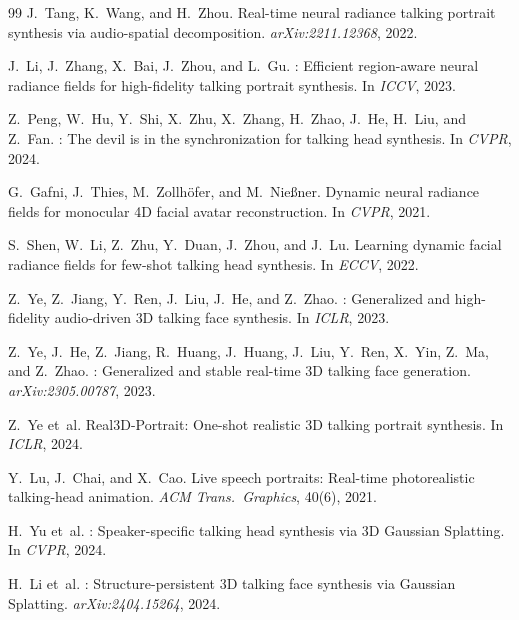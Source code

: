 \documentclass[10pt,twocolumn,letterpaper]{article}
\begin{document}
{\begin{thebibliography}{99}
J.~Tang, K.~Wang, and H.~Zhou.
\newblock Real-time neural radiance talking portrait synthesis via audio-spatial decomposition.
\newblock \emph{arXiv:2211.12368}, 2022.

J.~Li, J.~Zhang, X.~Bai, J.~Zhou, and L.~Gu.
: Efficient region-aware neural radiance fields for high-fidelity talking portrait synthesis.
\newblock In \emph{ICCV}, 2023.

Z.~Peng, W.~Hu, Y.~Shi, X.~Zhu, X.~Zhang, H.~Zhao, J.~He, H.~Liu, and Z.~Fan.
: The devil is in the synchronization for talking head synthesis.
\newblock In \emph{CVPR}, 2024.

G.~Gafni, J.~Thies, M.~Zollh{\"o}fer, and M.~Nie{\ss}ner.
\newblock Dynamic neural radiance fields for monocular {4D} facial avatar reconstruction.
\newblock In \emph{CVPR}, 2021.

S.~Shen, W.~Li, Z.~Zhu, Y.~Duan, J.~Zhou, and J.~Lu.
\newblock Learning dynamic facial radiance fields for few-shot talking head synthesis.
\newblock In \emph{ECCV}, 2022.

Z.~Ye, Z.~Jiang, Y.~Ren, J.~Liu, J.~He, and Z.~Zhao.
: Generalized and high-fidelity audio-driven {3D} talking face synthesis.
\newblock In \emph{ICLR}, 2023.

Z.~Ye, J.~He, Z.~Jiang, R.~Huang, J.~Huang, J.~Liu, Y.~Ren, X.~Yin, Z.~Ma, and Z.~Zhao.
: Generalized and stable real-time {3D} talking face generation.
\newblock \emph{arXiv:2305.00787}, 2023.

Z.~Ye et~al.
\newblock Real3D-Portrait: One-shot realistic {3D} talking portrait synthesis.
\newblock In \emph{ICLR}, 2024.

Y.~Lu, J.~Chai, and X.~Cao.
\newblock Live speech portraits: Real-time photorealistic talking-head animation.
\newblock \emph{ACM Trans.\ Graphics}, 40(6), 2021.

H.~Yu et~al.
: Speaker-specific talking head synthesis via {3D Gaussian Splatting}.
\newblock In \emph{CVPR}, 2024.

H.~Li et~al.
: Structure-persistent {3D} talking face synthesis via {Gaussian Splatting}.
\newblock \emph{arXiv:2404.15264}, 2024.


\end{thebibliography}}
\end{document}

